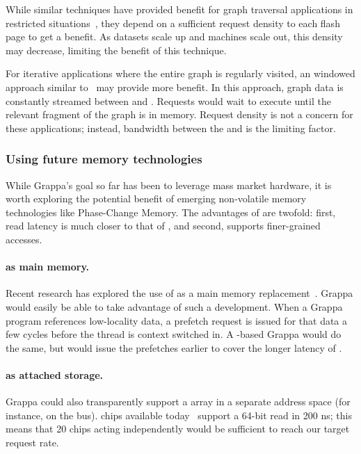 While similar techniques have provided benefit for graph traversal applications in
restricted situations~\cite{magt:2010}, they depend on a sufficient request
density to each flash page to get a benefit. As datasets scale up and machines scale out, this
density may decrease, limiting the benefit of this technique.

For iterative applications where the entire graph is regularly
visited, an windowed approach similar to~\cite{graphchi:osdi12} may
provide more benefit. In this approach, graph data is constantly
streamed between  and . Requests would wait to execute until the
relevant fragment of the graph is in memory. Request density is not a
concern for these applications; instead, bandwidth between the  and 
is the limiting factor.

\subsubsection{Using future memory technologies}

While Grappa's goal so far has been to leverage mass market hardware, it
is worth exploring the potential benefit of emerging non-volatile
memory technologies like Phase-Change Memory. The advantages of 
are twofold: first, read latency is much closer to that of , and
second,  supports finer-grained accesses.

\paragraph{ as main memory.}
Recent research has explored the use of  as a main memory
replacement~\cite{pcm:isca09}. Grappa would easily be able to take advantage of such a
development. When a Grappa program references low-locality data,
a prefetch request is issued for that data a few cycles before the
thread is context switched in. A -based
Grappa would do the same, but would issue the prefetches earlier to
cover the longer latency of .

\paragraph{ as attached storage.}
Grappa could also transparently support a  array in a separate address space (for
instance, on the  bus).  chips available today~\cite{micronPCM} support a
64-bit read in 200 ns; this means that 20 chips acting independently
would be sufficient to reach our target request rate.

